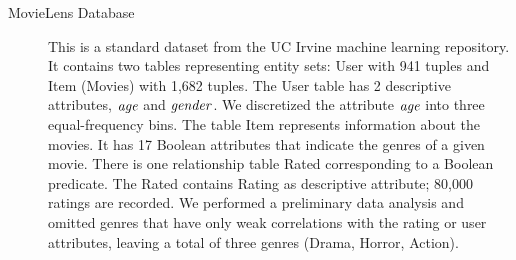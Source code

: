 \documentclass[runningheads,a4paper]{llncs}
\begin{document}

\begin{description}

\item[MovieLens Database] This is a standard dataset from the UC Irvine machine learning repository. 
It contains two tables representing entity sets: User with 941 tuples and Item (Movies) with 1,682 tuples.
The User table has 2 descriptive attributes, $\mathit{age}$ and $\it{gender}$. We discretized the attribute $\mathit{age}$ into three equal-frequency bins. The table Item represents information about the movies. It has 17 Boolean attributes that indicate the genres of a given movie. There is one relationship table Rated corresponding to a Boolean predicate. The Rated contains Rating as descriptive attribute; 80,000 ratings are recorded.  We performed a preliminary data analysis and omitted genres that have only weak correlations with the rating or user attributes, leaving a total of three genres (Drama, Horror, Action).
%


\end{description}
\end{document}
